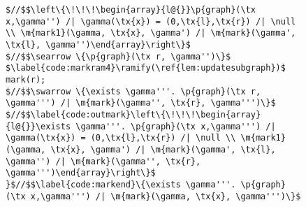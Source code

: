 \begin{figure}[t]
\begin{lstlisting}[multicols=2]
$//$$\left\{\!\!\!\begin{array}{l@{}}\p{graph}(\tx x,\gamma'') /| \gamma(\tx{x}) = (0,\tx{l},\tx{r}) /| \null \\ \m{mark1}(\gamma, \tx{x}, \gamma') /| \m{mark}(\gamma', \tx{l}, \gamma'')\end{array}\right\}$
$//$$\searrow \{\p{graph}(\tx r, \gamma'')\}$
$\label{code:markram4}\ramify(\ref{lem:updatesubgraph})$      mark(r);
$//$$\swarrow \{\exists \gamma'''. \p{graph}(\tx r, \gamma''') /| \m{mark}(\gamma'', \tx{r}, \gamma''')\}$
$//$$\label{code:outmark}\left\{\!\!\!\begin{array}{l@{}}\exists \gamma'''. \p{graph}(\tx x,\gamma''') /| \gamma(\tx{x}) = (0,\tx{l},\tx{r}) /| \null \\ \m{mark1}(\gamma, \tx{x}, \gamma') /| \m{mark}(\gamma', \tx{l}, \gamma'') /| \m{mark}(\gamma'', \tx{r}, \gamma''')\end{array}\right\}$
}$//$$\label{code:markend}\{\exists \gamma'''. \p{graph}(\tx x,\gamma''') /| \m{mark}(\gamma, \tx{x}, \gamma''')\}$
\end{lstlisting}


\end{figure}
